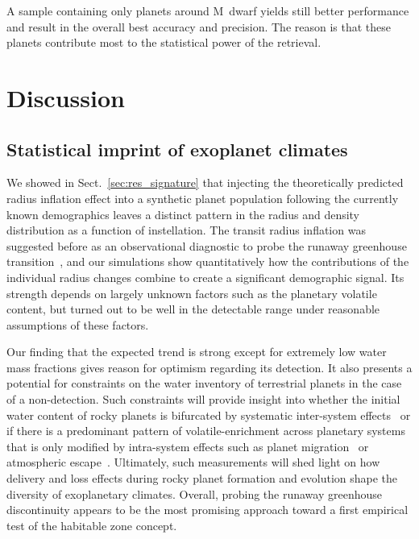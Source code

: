 \documentclass[twocolumn,twocolappendix]{aastex631}
\begin{document}
A sample containing only planets around M~dwarf yields still better performance and result in the overall best accuracy and precision.
The reason is that these planets contribute most to the statistical power of the retrieval.


\section{Discussion}\label{sec:discussion}

\subsection{Statistical imprint of exoplanet climates}
We showed in Sect.~\ref{sec:res_signature} that injecting the theoretically predicted radius inflation effect into a synthetic planet population following the currently known demographics leaves a distinct pattern in the radius and density distribution as a function of instellation.
The transit radius inflation was suggested before as an observational diagnostic to probe the runaway greenhouse transition~\citep{Turbet2019}, and our simulations show quantitatively how the contributions of the individual radius changes combine to create a significant demographic signal.
Its strength depends on largely unknown factors such as the planetary volatile content, but turned out to be well in the detectable range under reasonable assumptions of these factors.

Our finding that the expected trend is strong except for extremely low water mass fractions gives reason for optimism regarding its detection.
It also presents a potential for constraints on the water inventory of terrestrial planets in the case of a non-detection.
Such constraints will provide insight into whether the initial water content of rocky planets is bifurcated by systematic inter-system effects~\citep{Lichtenberg2019,2021ApJ...913L..20L,2022ApJ...938L...3L} or if there is a predominant pattern of volatile-enrichment across planetary systems that is only modified by intra-system effects such as planet migration~\citep{Schlecker2021} or atmospheric escape~\citep{Owen2016}.
Ultimately, such measurements will shed light on how delivery and loss effects during rocky planet formation and evolution shape the diversity of exoplanetary climates.
Overall, probing the runaway greenhouse discontinuity appears to be the most promising approach toward a first empirical test of the habitable zone concept.
\end{document}
